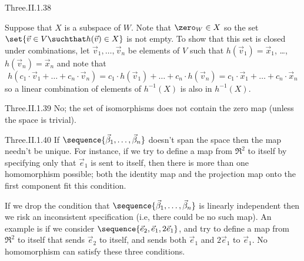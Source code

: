 \begin{ans}{Three.II.1.38}
\begin{exparts}
          Suppose that \( X \) is a subspace of \( W \).
          Note that \( \zero_W\in X \) so the set
          \( \set{\vec{v}\in V \suchthat h(\vec{v})\in X} \) is not empty.
          To show that this set is closed under combinations, let
          \( \vec{v}_1,\dots,\vec{v}_n \) be elements of \( V \)
          such that \( h(\vec{v}_1)=\vec{x}_1 \), \ldots,
          \( h(\vec{v}_n)=\vec{x}_n \) and note that
          \begin{equation*}
            h(c_1\cdot \vec{v}_1+\dots+c_n\cdot \vec{v}_n)
            =c_1\cdot h(\vec{v}_1)+\dots+c_n\cdot h(\vec{v}_n)
            =c_1\cdot \vec{x}_1+\dots+c_n\cdot \vec{x}_n
          \end{equation*}
          so a linear combination of elements of \( h^{-1}(X) \) is also in
          \( h^{-1}(X) \).
      \end{exparts}
     
\end{ans}
\begin{ans}{Three.II.1.39}
      No; the set of isomorphisms does not contain the zero map
      (unless the space is trivial).
    
\end{ans}
\begin{ans}{Three.II.1.40}
     If $\sequence{\vec{\beta}_1,\ldots,\vec{\beta}_n}$ doesn't span the space
     then the map needn't be unique.
     For instance, if we try to define a map from $\Re^2$ to itself by
     specifying only that $\vec{e}_1$ is sent to itself, then
     there is more than
     one homomorphism possible; both the identity map and the projection map
     onto the first component fit this condition.

     If we drop the condition that
     $\sequence{\vec{\beta}_1,\ldots,\vec{\beta}_n}$
     is linearly independent then we risk an inconsistent specification
     (i.e, there could be no such map).
     An example is if we consider
     $\sequence{\vec{e}_2,\vec{e}_1,2\vec{e}_1}$, and try
     to define a map from $\Re^2$ to itself that
     sends $\vec{e}_2$ to itself, and sends both
     $\vec{e}_1$ and $2\vec{e}_1$ to $\vec{e}_1$.
     No homomorphism can satisfy these three conditions.
   
\end{ans}
